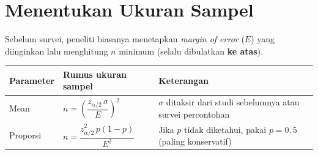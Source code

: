 \documentclass[
  indonesian,
  letterpaper,
]{book}
\newcounter{none} %
\begin{document}
\section{Menentukan Ukuran Sampel}\label{menentukan-ukuran-sampel}

Sebelum survei, peneliti biasanya menetapkan \emph{margin of error}
(\(E\)) yang diinginkan lalu menghitung \(n\) minimum (selalu dibulatkan
\textbf{ke atas}).

{\def\LTcaptype{none} %
\begin{longtable}[]{@{}
  >{\raggedright\arraybackslash}p{}
  >{\raggedright\arraybackslash}p{}
  >{\raggedright\arraybackslash}p{}@{}}
\toprule\noalign{}
\begin{minipage}[b]{\linewidth}\raggedright
Parameter
\end{minipage} & \begin{minipage}[b]{\linewidth}\raggedright
Rumus ukuran sampel
\end{minipage} & \begin{minipage}[b]{\linewidth}\raggedright
Keterangan
\end{minipage} \\
\midrule\noalign{}
\endhead
\bottomrule\noalign{}
\endlastfoot
Mean & \(n = \left(\dfrac{z_{\alpha/2}\,\sigma}{E}\right)^2\) &
\(\sigma\) ditaksir dari studi sebelumnya atau survei percontohan \\
Proporsi & \(n = \dfrac{z_{\alpha/2}^2\,p(1-p)}{E^2}\) & Jika \(p\)
tidak diketahui, pakai \(p = 0{,}5\) (paling konservatif) \\
\end{longtable}
}
\end{document}

